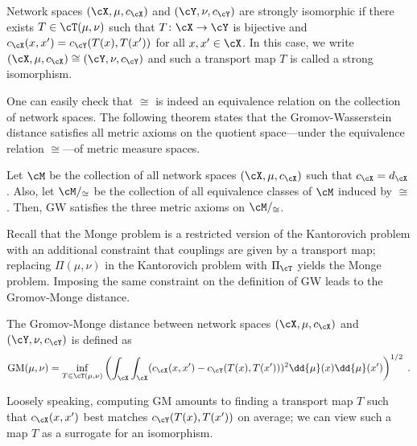 \documentclass[11pt]{article}
\begin{document}
\begin{definition}
	\label{def:iso}
	Network spaces $(\cX, \mu, c_{\cX})$ and $(\cY, \nu, c_{\cY})$ are strongly isomorphic if there exists $T \in \cT(\mu, \nu)$ such that $T \colon \cX \to \cY$ is bijective and $c_{\cX}(x, x') = c_{\cY}(T(x), T(x'))$ for all $x, x' \in \cX$. In this case, we write $(\cX, \mu, c_{\cX}) \cong (\cY, \nu, c_{\cY})$ and such a transport map $T$ is called a strong isomorphism.
\end{definition}

One can easily check that $\cong$ is indeed an equivalence relation on the collection of network spaces. The following theorem states that the Gromov-Wasserstein distance satisfies all metric axioms on the quotient space---under the equivalence relation $\cong$---of metric measure spaces.

\begin{theorem}
	\label{thm:1}
	Let $\cM$ be the collection of all network spaces $(\cX, \mu, c_{\cX})$ such that $c_{\cX} = d_{\cX}$. Also, let $\cM/_{\cong}$ be the collection of all equivalence classes of $\cM$ induced by $\cong$. Then, GW satisfies the three metric axioms on $\cM/_{\cong}$.
\end{theorem}

Recall that the Monge problem is a restricted version of the Kantorovich problem with an additional constraint that couplings are given by a transport map; replacing $\Pi(\mu, \nu)$ in the Kantorovich problem with $\Pi_{\cT}$ yields the Monge problem. Imposing the same constraint on the definition of GW leads to the Gromov-Monge distance.
\begin{definition}
	The Gromov-Monge distance between network spaces $(\cX, \mu, c_{\cX})$ and $(\cY, \nu, c_{\cY})$ is defined as
	\begin{equation*}
		\mathrm{GM}(\mu, \nu) = \inf_{T \in \cT(\mu, \nu)} \left( \int_{\cX} \int_{\cX} (c_{\cX}(x, x') - c_{\cY}(T(x), T(x')))^2 \dd{\mu}(x) \dd{\mu}(x') \right)^{1/2} \;.
	\end{equation*}
\end{definition}
Loosely speaking, computing GM amounts to finding a transport map $T$ such that $c_{\cX}(x, x')$ best matches $c_{\cY}(T(x), T(x'))$ on average; we can view such a map $T$ as a surrogate for an isomorphism.
\end{document}
